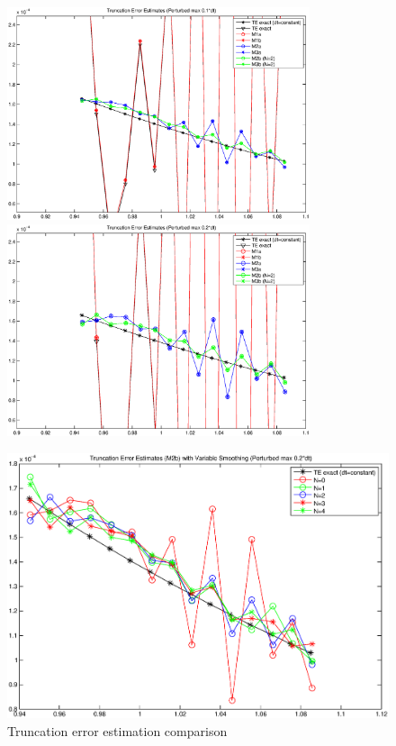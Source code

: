 \documentclass[10pt]{article}%
\begin{document}
\begin{figure}[H]
  \begin{minipage}{0.5\textwidth}
    \centering
    \includegraphics[width=3.5in]{TE_ex_vs_est_1}
  \end{minipage}
  \hfill
  \begin{minipage}{0.5\textwidth}
    \centering
    \includegraphics[width=3.5in]{TE_ex_vs_est_2}
  \end{minipage}
\end{figure}

\begin{figure}[H]
    \centering
    \includegraphics[width=4.5in]{TE_ex_vs_est_varsmoothing}
    \caption{Truncation error estimation comparison}
\end{figure}
\end{document}
